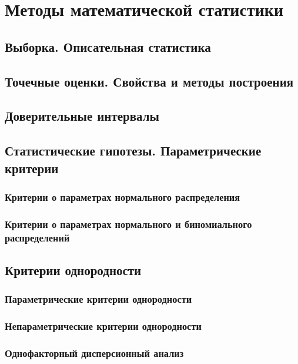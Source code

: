 \section{Методы математической статистики}

\subsection{Выборка. Описательная статистика}

\subsection{Точечные оценки. Свойства и методы построения}


\subsection{Доверительные интервалы}

\subsection{Статистические гипотезы. Параметрические критерии}

\subsubsection{Критерии о параметрах нормального распределения}

\subsubsection{Критерии о параметрах нормального и биномиального распределений}

\subsection{Критерии однородности}

\subsubsection{Параметрические критерии однородности}

\subsubsection{Непараметрические критерии однородности}

\subsubsection{Однофакторный дисперсионный анализ}

